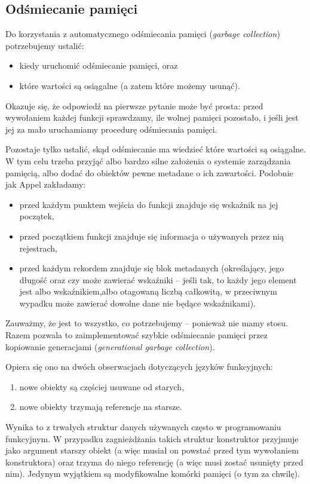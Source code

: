 \documentclass[11pt]{scrartcl}
\begin{document}
\subsection{Odśmiecanie pamięci}
Do korzystania z automatycznego odśmiecania pamięci (\textit{garbage collection})
potrzebujemy ustalić:
\begin{itemize}
\item  kiedy uruchomić odśmiecanie pamięci, oraz
\item które wartości są osiągalne (a zatem które możemy usunąć).
\end{itemize}
Okazuje się, że odpowiedź na pierwsze pytanie może być prosta: przed wywołaniem
każdej funkcji sprawdzamy, ile wolnej pamięci pozostało, i jeśli jest jej za
mało uruchamiamy procedurę odśmiecania pamięci.

Pozostaje tylko ustalić, skąd odśmiecanie ma wiedzieć które wartości są
osiągalne. W tym celu trzeba przyjąć albo bardzo silne założenia o systemie
zarządzania pamięcią, albo dodać do obiektów pewne metadane o ich zawartości.
Podobnie jak Appel \cite[Chapter 16.4: Runtime data formats]{Appel} zakładamy:
\begin{itemize}
\item przed każdym punktem wejścia do funkcji znajduje się wskaźnik na jej
  początek,
\item przed początkiem funkcji znajduje się informacja o używanych przez nią
  rejestrach,
\item przed każdym rekordem znajduje się blok metadanych (określający, jego
  długość oraz czy może zawierać wskaźniki -- jeśli tak, to każdy jego element
  jest albo wskaźnikiem,albo otagowaną liczbą całkowitą, w przeciwnym wypadku
  może zawierać dowolne dane nie będące wskaźnikami).
\end{itemize}

Zauważmy, że jest to wszystko, co potrzebujemy -- ponieważ nie mamy stosu. Razem
pozwala to zaimplementować szybkie odśmiecanie pamięci przez kopiowanie
generacjami (\textit{generational garbage collection}).

Opiera się ono na dwóch obserwacjach dotyczących języków funkcyjnych:
\begin{enumerate}
\item nowe obiekty są częściej usuwane od starych,
\item nowe obiekty trzymają referencje na starsze.
\end{enumerate}

Wynika to z trwałych struktur danych używanych często w programowaniu
funkcyjnym. W przypadku zagnieżdżania takich struktur konstruktor przyjmuje jako
argument starszy obiekt (a więc musiał on powstać przed tym wywołaniem
konstruktora) oraz trzyma do niego referencję (a więc musi zostać usunięty przed
nim). Jedynym wyjątkiem są modyfikowalne komórki pamięci (o tym za chwilę).
\end{document}
